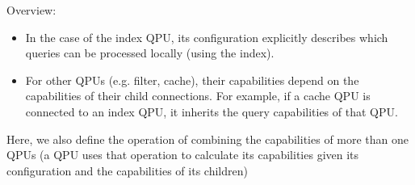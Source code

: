 Overview:
\begin{itemize}
  \item In the case of the index QPU, its configuration explicitly describes which queries can be processed locally
  (using the index).
  \item For other QPUs (e.g. filter, cache), their capabilities depend on the capabilities of their child connections.
  For example, if a cache QPU is connected to an index QPU, it inherits the query capabilities of that QPU.
\end{itemize}

Here, we also define the operation of combining the capabilities of more than one QPUs (a QPU uses that operation to
calculate its capabilities given its configuration and the capabilities of its children)


